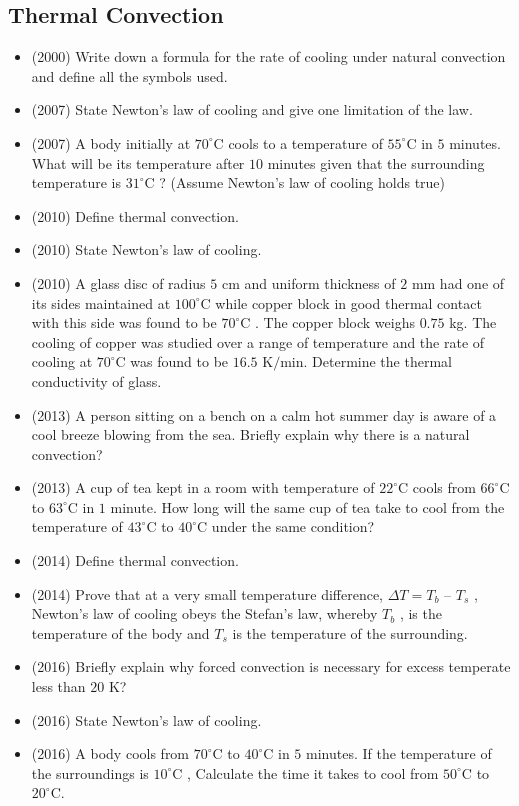 \documentclass{article}
\begin{document}
\subsection{Thermal Convection}
\begin{itemize}
\item (2000)  Write down a formula for the rate of cooling under natural convection and define all the symbols used. 
\item (2007)  State Newton’s law of cooling and give one limitation of the law.
\item (2007)  A body initially at $ 70^{\circ}$C cools to a temperature of $ 55^{\circ}$C in $ 5$ minutes. What will be its temperature after $ 10$ minutes given that the surrounding temperature is $ 31^{\circ}$C ? (Assume Newton’s law of cooling holds true)
\item (2010)  Define thermal convection.
\item (2010)  State Newton’s law of cooling.
\item (2010)  A glass disc of radius $ 5$ cm and uniform thickness of $ 2$ mm had one of its sides maintained at $ 100^{\circ}$C while copper block in good thermal contact with this side was found to be $ 70^{\circ}$C . The copper block weighs $ 0.75$ kg. The cooling of copper was studied over a range of temperature and the rate of cooling at $ 70^{\circ}$C was found to be $ 16.5$ K$/$min. Determine the thermal conductivity of glass.
\item (2013)  A person sitting on a bench on a calm hot summer day is aware of a cool breeze blowing from the sea. Briefly explain why there is a natural convection?
\item (2013)  A cup of tea kept in a room with temperature of $ 22^{\circ}$C cools from $ 66^{\circ}$C to $ 63^{\circ}$C in $ 1$ minute. How long will the same cup of tea take to cool from the temperature of $ 43^{\circ}$C to $ 40^{\circ}$C under the same condition?
\item (2014)  Define thermal convection.
\item (2014)  Prove that at a very small temperature difference, $ \Delta T=T_{b}$ – $ T_{s}$ ,  Newton's law of cooling obeys the Stefan’s law, whereby $ T_{b}$ , is the temperature of the body and $ T_{s}$ is the temperature of the surrounding. 
\item (2016)  Briefly explain why forced convection is necessary for excess temperate less than $ 20$ K? 
\item (2016)  State Newton’s law of cooling. 
\item (2016)  A body cools from $ 70^{\circ}$C to $ 40^{\circ}$C in $ 5$ minutes. If the temperature of the surroundings is $ 10^{\circ}$C , Calculate the time it takes to cool from $ 50^{\circ}$C to $ 20^{\circ}$C.  
\end{itemize}
\end{document}

